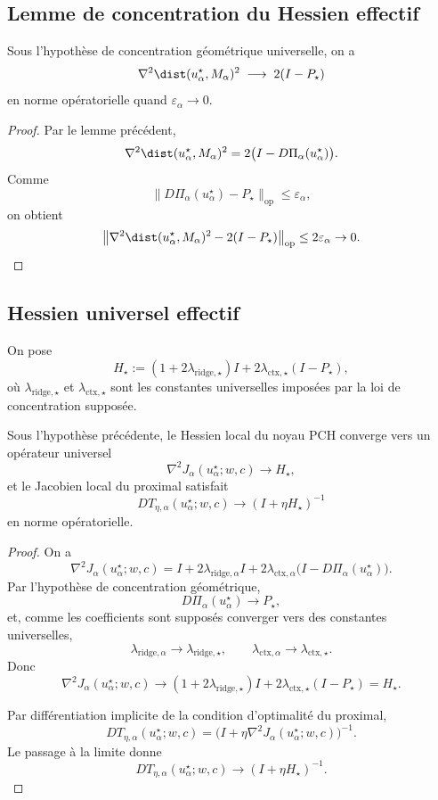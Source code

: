 \subsection{Lemme de concentration du Hessien effectif}

\begin{lemma}
Sous l'hypothèse de concentration géométrique universelle, on a
\[
\nabla^2 \dist(u_\alpha^\star,M_\alpha)^2
\;\longrightarrow\;
2(I-P_\star)
\]
en norme opératorielle quand $\varepsilon_\alpha\to 0$.
\end{lemma}

\begin{proof}
Par le lemme précédent,
\[
\nabla^2 \dist(u_\alpha^\star,M_\alpha)^2
=
2\bigl(I-D\Pi_\alpha(u_\alpha^\star)\bigr).
\]
Comme
\[
\|D\Pi_\alpha(u_\alpha^\star)-P_\star\|_{\mathrm{op}}
\le \varepsilon_\alpha,
\]
on obtient
\[
\left\|
\nabla^2 \dist(u_\alpha^\star,M_\alpha)^2
-
2(I-P_\star)
\right\|_{\mathrm{op}}
\le 2\varepsilon_\alpha \to 0.
\]
\end{proof}

\subsection{Hessien universel effectif}

On pose
\[
H_\star
:=
(1+2\lambda_{\mathrm{ridge},\star})I
+
2\lambda_{\mathrm{ctx},\star}(I-P_\star),
\]
où $\lambda_{\mathrm{ridge},\star}$ et $\lambda_{\mathrm{ctx},\star}$ sont les constantes universelles imposées par la loi de concentration supposée.

\begin{theorem}
Sous l'hypothèse précédente, le Hessien local du noyau PCH converge vers un opérateur universel
\[
\nabla^2 J_\alpha(u_\alpha^\star;w,c)\to H_\star,
\]
et le Jacobien local du proximal satisfait
\[
DT_{\eta,\alpha}(u_\alpha^\star;w,c)
\to
(I+\eta H_\star)^{-1}
\]
en norme opératorielle.

\end{theorem}

\begin{proof}
On a
\[
\nabla^2 J_\alpha(u_\alpha^\star;w,c)
=
I
+
2\lambda_{\mathrm{ridge},\alpha}I
+
2\lambda_{\mathrm{ctx},\alpha}\bigl(I-D\Pi_\alpha(u_\alpha^\star)\bigr).
\]
Par l'hypothèse de concentration géométrique,
\[
D\Pi_\alpha(u_\alpha^\star)\to P_\star,
\]
et, comme les coefficients sont supposés converger vers des constantes universelles,
\[
\lambda_{\mathrm{ridge},\alpha}\to \lambda_{\mathrm{ridge},\star},
\qquad
\lambda_{\mathrm{ctx},\alpha}\to \lambda_{\mathrm{ctx},\star}.
\]
Donc
\[
\nabla^2 J_\alpha(u_\alpha^\star;w,c)\to
(1+2\lambda_{\mathrm{ridge},\star})I
+
2\lambda_{\mathrm{ctx},\star}(I-P_\star)
=
H_\star.
\]

Par différentiation implicite de la condition d'optimalité du proximal,
\[
DT_{\eta,\alpha}(u_\alpha^\star;w,c)
=
\bigl(I+\eta \nabla^2 J_\alpha(u_\alpha^\star;w,c)\bigr)^{-1}.
\]
Le passage à la limite donne
\[
DT_{\eta,\alpha}(u_\alpha^\star;w,c)
\to
(I+\eta H_\star)^{-1}.
\]
\end{proof}

